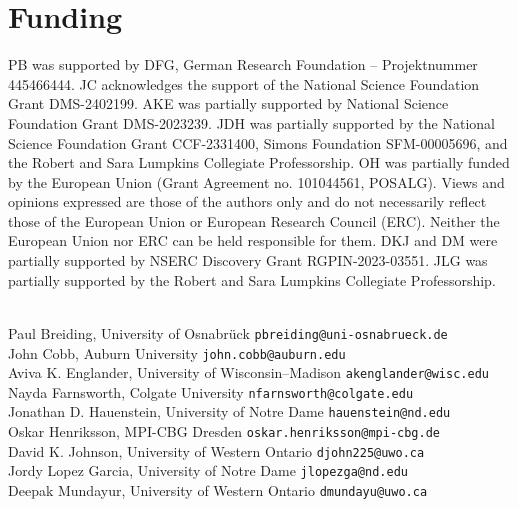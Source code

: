\documentclass[11pt]{article}
\numberwithin{equation}{section}
\theoremstyle{plain}
\theoremstyle{definition}
\theoremstyle{remark}
\begin{document}
\section*{Funding}
PB was supported by DFG, German Research Foundation -- Projektnummer 445466444.
JC acknowledges the support of the National Science Foundation Grant DMS-2402199.
AKE was partially supported by National Science Foundation Grant DMS-2023239.
JDH was partially supported
by the 
National Science Foundation Grant CCF-2331400, Simons
Foundation SFM-00005696,
and the Robert and Sara Lumpkins Collegiate Professorship.
OH was partially funded by
the European Union (Grant Agreement no. 101044561, POSALG). Views and opinions expressed
are those of the authors only and do not necessarily reflect those of the European Union or European
Research Council (ERC). Neither the European Union nor ERC can be held responsible for them. DKJ and DM were partially supported by NSERC Discovery Grant RGPIN-2023-03551. 
JLG was partially supported by the Robert and Sara Lumpkins Collegiate Professorship.


\newlength{\bibitemsep}\setlength{\bibitemsep}{.05\baselineskip plus .05\baselineskip minus .05\baselineskip}
\newlength{\bibparskip}\setlength{\bibparskip}{0pt}
\let\oldthebibliography\thebibliography
\renewcommand\thebibliography[1]{
  \oldthebibliography{#1}
  \setlength{\parskip}{6\bibitemsep}
  \setlength{\itemsep}{\bibparskip}
}





\bigskip

{\samepage

\\
Paul Breiding, University of Osnabr\"uck \hfill{\tt pbreiding@uni-osnabrueck.de}\\
John Cobb, Auburn University \hfill{\tt john.cobb@auburn.edu}\\
Aviva K. Englander, University of Wisconsin--Madison \hfill{\tt akenglander@wisc.edu}\\
Nayda Farnsworth, Colgate University \hfill{\tt nfarnsworth@colgate.edu}\\
Jonathan D. Hauenstein, University of Notre Dame \hfill{\tt hauenstein@nd.edu}\\
Oskar Henriksson, MPI-CBG Dresden \hfill{\tt oskar.henriksson@mpi-cbg.de}\\
David K. Johnson, University of Western Ontario \hfill{\tt djohn225@uwo.ca}\\
Jordy Lopez Garcia, University of Notre Dame \hfill{\tt jlopezga@nd.edu}\\
Deepak Mundayur, University of Western Ontario \hfill{\tt dmundayu@uwo.ca}

}
\end{document}
